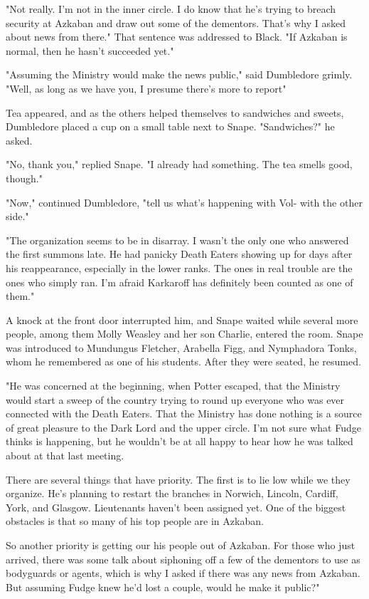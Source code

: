 "Not really. I'm not in the inner circle. I do know that he's trying to breach security at Azkaban and draw out some of the dementors. That's why I asked about news from there." That sentence was addressed to Black. "If Azkaban is normal, then he hasn't succeeded yet."

"Assuming the Ministry would make the news public," said Dumbledore grimly. "Well, as long as we have you, I presume there's more to report{\el}"

Tea appeared, and as the others helped themselves to sandwiches and sweets, Dumbledore placed a cup on a small table next to Snape. "Sandwiches?" he asked.

"No, thank you," replied Snape. "I already had something. The tea smells good, though."

"Now," continued Dumbledore, "tell us what's happening with Vol-{\el} with the other side."

"The organization seems to be in disarray. I wasn't the only one who answered the first summons late. He had panicky Death Eaters showing up for days after his reappearance, especially in the lower ranks. The ones in real trouble are the ones who simply ran. I'm afraid Karkaroff has definitely been counted as one of them."

A knock at the front door interrupted him, and Snape waited while several more people, among them Molly Weasley and her son Charlie, entered the room. Snape was introduced to Mundungus Fletcher, Arabella Figg, and Nymphadora Tonks, whom he remembered as one of his students. After they were seated, he resumed.

"He was concerned at the beginning, when Potter escaped, that the Ministry would start a sweep of the country trying to round up everyone who was ever connected with the Death Eaters. That the Ministry has done nothing is a source of great pleasure to the Dark Lord and the upper circle. I'm not sure what Fudge thinks is happening, but he wouldn't be at all happy to hear how he was talked about at that last meeting.

\textooquote There are several things that have priority. The first is to lie low while we{\el} they organize. He's planning to restart the branches in Norwich, Lincoln, Cardiff, York, and Glasgow. Lieutenants haven't been assigned yet. One of the biggest obstacles is that so many of his top people are in Azkaban.

\textooquote So another priority is getting our{\el} his people out of Azkaban. For those who just arrived, there was some talk about siphoning off a few of the dementors to use as bodyguards or agents, which is why I asked if there was any news from Azkaban. But assuming Fudge knew he'd lost a couple, would he make it public?"

